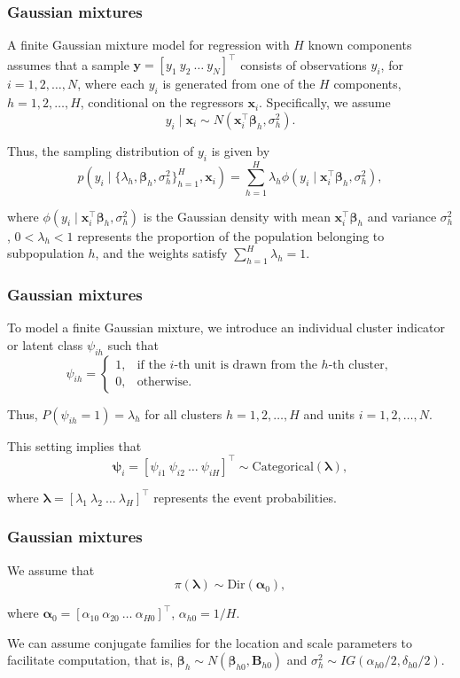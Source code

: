 \documentclass[12pt, compress]{beamer}
\begin{document}
\begin{frame}
	\frametitle{Gaussian mixtures}
A finite Gaussian mixture model for regression with \( H \) known components assumes that a sample 
\( \boldsymbol{y}=\left[y_1 \ y_2 \ \dots \ y_N\right]^{\top} \) consists of observations \( y_i \), 
for \( i=1,2,\dots,N \), where each \( y_i \) is generated from one of the \( H \) components, 
\( h=1,2,\dots,H \), conditional on the regressors \( \boldsymbol{x}_i \). Specifically, we assume  
\[
y_i \mid \boldsymbol{x}_i \sim N(\boldsymbol{x}_i^{\top}\boldsymbol{\beta}_h, \sigma_h^2).
\]

Thus, the sampling distribution of \( y_i \) is given by  
\[
p(y_i \mid \{\lambda_h, \boldsymbol{\beta}_h, \sigma_h^2\}_{h=1}^H, \boldsymbol{x}_i) = 
\sum_{h=1}^H \lambda_h \phi(y_i \mid \boldsymbol{x}_i^{\top}\boldsymbol{\beta}_h, \sigma_h^2),
\]

where \( \phi(y_i \mid \boldsymbol{x}_i^{\top}\boldsymbol{\beta}_h, \sigma_h^2) \) is the Gaussian density with mean 
\( \boldsymbol{x}_i^{\top}\boldsymbol{\beta}_h \) and variance \( \sigma_h^2 \), \( 0 < \lambda_h < 1 \) represents 
the proportion of the population belonging to subpopulation \( h \), and the weights satisfy 
\( \sum_{h=1}^H \lambda_h = 1 \).
\end{frame}

\begin{frame}
	\frametitle{Gaussian mixtures}
To model a finite Gaussian mixture, we introduce an individual cluster indicator or latent class \( \psi_{ih} \) such that  
\[
\psi_{ih}=
\begin{cases}
	1, & \text{if the } i\text{-th unit is drawn from the } h\text{-th cluster}, \\
	0, & \text{otherwise}.
\end{cases}
\]

Thus, \( P(\psi_{ih}=1) = \lambda_h \) for all clusters \( h=1,2,\dots,H \) and units \( i=1,2,\dots,N \).

This setting implies that  
\[
\boldsymbol{\psi}_i = [\psi_{i1} \  \psi_{i2} \ \dots \ \psi_{iH}]^{\top} \sim \text{Categorical}(\boldsymbol{\lambda}),
\] 
  
where \( \boldsymbol{\lambda} = [\lambda_1 \  \lambda_2 \  \dots \ \lambda_H]^{\top} \) represents the event probabilities.
\end{frame}

\begin{frame}
	\frametitle{Gaussian mixtures}
We assume that  
\[
\pi(\boldsymbol{\lambda}) \sim \text{Dir}(\boldsymbol{\alpha}_0),
\]  

where \( \boldsymbol{\alpha}_0 = [\alpha_{10} \ \alpha_{20} \ \dots \ \alpha_{H0}]^{\top} \), $\alpha_{h0}=1/H$.

We can assume conjugate families for the location and scale parameters to facilitate computation, that is, $\boldsymbol \beta_h\sim N(\boldsymbol{\beta}_{h0},\boldsymbol{B}_{h0})$ and $\sigma_h^2\sim IG(\alpha_{h0}/2,\delta_{h0}/2)$.

\end{frame}
\end{document}
